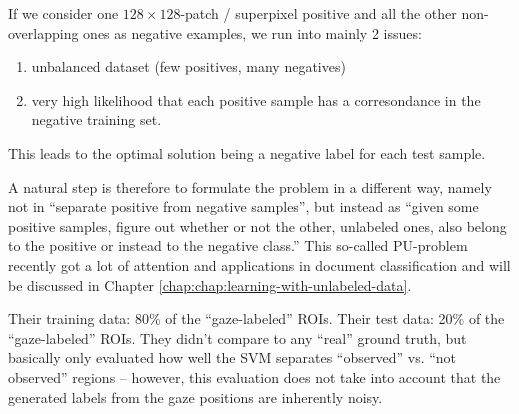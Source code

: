 If we consider one $128 \times 128$-patch / superpixel positive and all the other non-overlapping ones as negative examples, we run into mainly 2 issues: 
\begin{enumerate}
 \item unbalanced dataset (few positives, many negatives)
 \item very high likelihood that each positive sample has a corresondance in the negative training set.
\end{enumerate}
This leads to the optimal solution being a negative label for each test sample.

A natural step is therefore to formulate the problem in a different way, namely not in ``separate positive from negative samples'', but instead as ``given some positive samples, figure out whether or not the other, unlabeled ones, also belong to the positive or instead to the negative class.'' 
This so-called PU-problem recently got a lot of attention and applications in document classification and will be discussed in Chapter \ref{chap:chap:learning-with-unlabeled-data}.

Their training data: 80\% of the ``gaze-labeled'' ROIs. Their test data: 20\% of the ``gaze-labeled'' ROIs. They didn't compare to any ``real'' ground truth, but basically only evaluated how well the SVM separates ``observed'' vs. ``not observed'' regions  -- however, this evaluation does not take into account that the generated labels from the gaze positions are inherently noisy.
